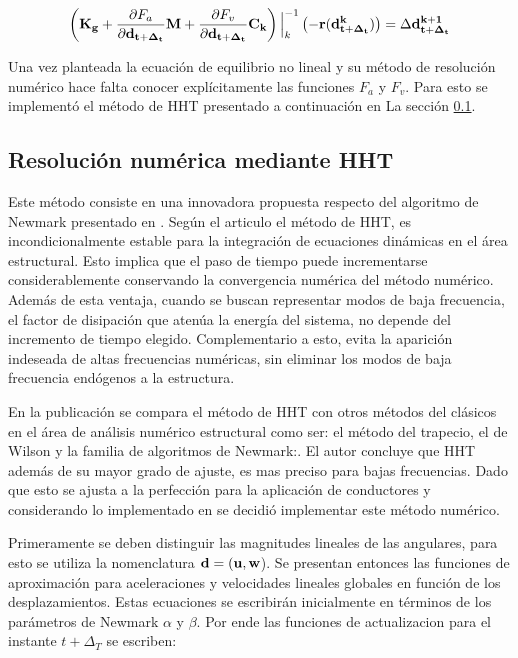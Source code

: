 \begin{equation}\label{Eq:Pre:Incremento}
	\left (\bf{K}_g+\frac{\partial\text{$ F_a$}}{\partial \bf{{d}}_{t+\Delta_t}}\bf{M} + \frac{\partial\text{$ F_v$}}{\partial \bf{{d}}_{t+\Delta_t}}\bf{C}_k \right)\Big|_k^{-1} \left(-\bf{r}(\bf{d}^k_{t+\Delta_t})\right)=  \Delta\bf{d}^{k+1}_{t+\Delta_t}
\end{equation}

Una vez planteada la ecuación de equilibrio no lineal y su método de resolución numérico hace falta conocer explícitamente las funciones $F_a$ y $F_v$. Para esto se implementó el método de HHT presentado a continuación en La sección \ref{Sec:MET:HHT}. 



\subsection{Resolución numérica mediante HHT}\label{Sec:MET:HHT}
%
 Este método consiste en una innovadora propuesta respecto del algoritmo de Newmark presentado en \cite{newmark1959method}. Según el articulo \cite{hilber1977improved} el método de HHT, es incondicionalmente estable para la integración de ecuaciones dinámicas en el área estructural. Esto implica que el paso de tiempo puede incrementarse considerablemente conservando la convergencia numérica del método numérico. Además de esta ventaja, cuando se buscan representar modos de baja frecuencia, el factor de disipación que atenúa la energía del sistema, no depende del incremento de tiempo elegido. Complementario a esto,  evita la aparición indeseada de altas frecuencias numéricas, sin eliminar los modos de baja frecuencia endógenos a la estructura. 
 
 En la publicación \citep{hilber1977improved}  se compara el método de HHT con otros métodos del clásicos en el área de análisis numérico estructural como ser: el método del trapecio, el de Wilson y la familia de algoritmos de Newmark:. El autor concluye que HHT además de su mayor grado de ajuste, es mas preciso para bajas frecuencias. Dado que esto se ajusta a la perfección para la aplicación de conductores y considerando lo implementado en \cite{Le2014} se decidió implementar este método numérico.   
 
 Primeramente se deben distinguir las magnitudes lineales de las angulares, para esto se utiliza la nomenclatura $\bf{d}=(\bf{u},\bf{w}$). Se presentan entonces las funciones de aproximación para aceleraciones y velocidades lineales globales en función de los desplazamientos. Estas ecuaciones se escribirán inicialmente en términos de los parámetros de Newmark $\alpha$ y $\beta$. Por ende las funciones de actualizacion para el instante $t+\Delta_T$ se escriben:
 

